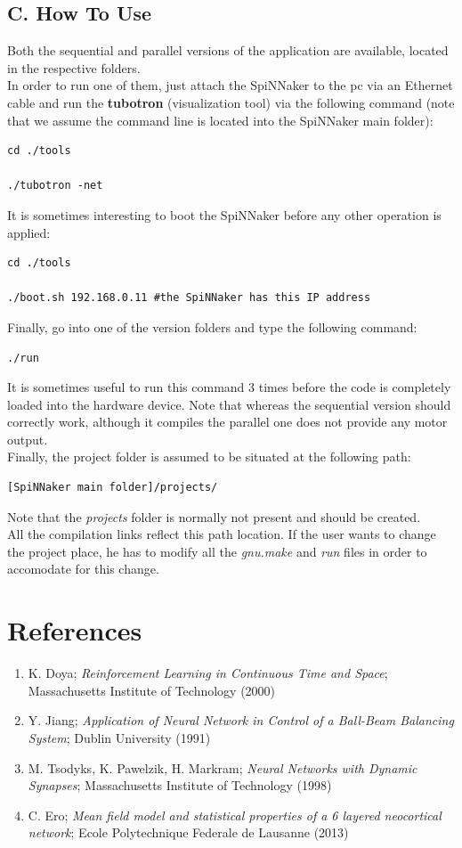 \documentclass{article}
\begin{document}
\subsection*{C. How To Use}
Both the sequential and parallel versions of the application are available, located in the respective folders.\\

In order to run one of them, just attach the SpiNNaker to the pc via an Ethernet cable and run the \textbf{tubotron} (visualization tool) via the following command (note that we assume the command line is located into the SpiNNaker main folder):
\begin{verbatim}
cd ./tools

./tubotron -net
\end{verbatim}

It is sometimes interesting to boot the SpiNNaker before any other operation is applied:
\begin{verbatim}
cd ./tools

./boot.sh 192.168.0.11 #the SpiNNaker has this IP address
\end{verbatim}

Finally, go into one of the version folders and type the following command:
\begin{verbatim}
./run
\end{verbatim}
It is sometimes useful to run this command 3 times before the code is completely loaded into the hardware device. Note that whereas the sequential version should correctly work, although it compiles the parallel one does not provide any motor output.\\

Finally, the project folder is assumed to be situated at the following path:
\begin{verbatim}
[SpiNNaker main folder]/projects/
\end{verbatim}
Note that the \textit{projects} folder is normally not present and should be created.\\
All the compilation links reflect this path location. If the user wants to change the project place, he has to modify all the \textit{gnu.make} and \textit{run} files in order to accomodate for this change.

\section{References}
\begin{enumerate}
\item K. Doya; \textit{Reinforcement Learning in Continuous Time and Space}; Massachusetts Institute of Technology (2000)
\item Y. Jiang; \textit{Application of Neural Network in Control
of a Ball-Beam Balancing System}; Dublin University (1991)
\item M. Tsodyks, K. Pawelzik, H. Markram; \textit{Neural Networks with Dynamic Synapses}; Massachusetts Institute of Technology (1998)
\item C. Ero; \textit{Mean field model and statistical properties of a 6 layered neocortical network}; Ecole Polytechnique Federale de Lausanne (2013)

\end{enumerate}
\end{document}
